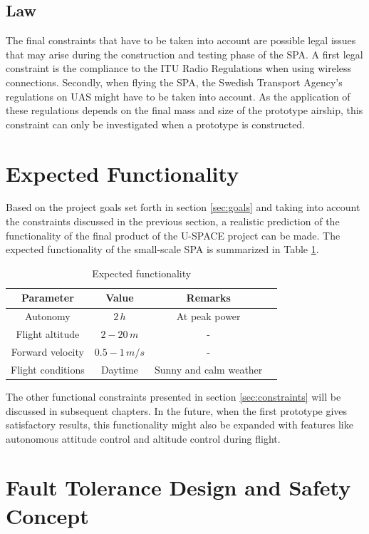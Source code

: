 \subsection{Law}
%
The final constraints that have to be taken into account are possible legal issues that may arise during the construction and testing phase of the \ac{SPA}. A first legal constraint is the compliance to the \ac{ITU} Radio Regulations \cite{book:freqalloc} when using wireless connections. Secondly, when flying the \ac{SPA}, the Swedish Transport Agency's regulations on \ac{UAS} \cite{regulations:uas2009} might have to be taken into account. As the application of these regulations depends on the final mass and size of the prototype airship, this constraint can only be investigated when a prototype is constructed.
%
\section{Expected Functionality}
%
Based on the project goals set forth in section \ref{sec:goals} and taking into account the constraints discussed in the previous section, a realistic prediction of the functionality of the final product of the \ac{U-SPACE} project can be made. The expected functionality of the small-scale \ac{SPA} is summarized in Table \ref{tab:expected}.
%
\begin{table}[H]
\centering
\caption{Expected functionality}
\label{tab:expected}
\begin{tabular}{c c c c}
\hline
\textbf{Parameter} & \textbf{Value} & \textbf{Remarks}\\ \hline
Autonomy & $2\,h$ & At peak power\\
Flight altitude & $2-20\,m$ & -\\
Forward velocity & $0.5-1\,m/s$ & -\\
Flight conditions & Daytime & Sunny and calm weather\\
\hline
\end{tabular}
\end{table}
%
\noindent
The other functional constraints presented in section \ref{sec:constraints} will be discussed in subsequent chapters. In the future, when the first prototype gives satisfactory results, this functionality might also be expanded with features like autonomous attitude control and altitude control during flight.

\section{Fault Tolerance Design and Safety Concept}

